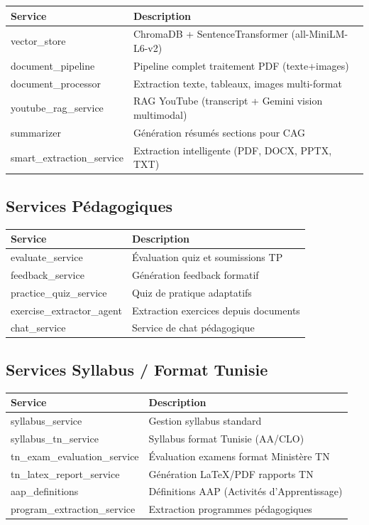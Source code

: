 \documentclass[12pt,a4paper]{article}
\begin{document}
\begin{longtable}{lp{9cm}}
\toprule
\textbf{Service} & \textbf{Description} \\
\midrule
vector\_store & ChromaDB + SentenceTransformer (all-MiniLM-L6-v2) \\
document\_pipeline & Pipeline complet traitement PDF (texte+images) \\
document\_processor & Extraction texte, tableaux, images multi-format \\
youtube\_rag\_service & RAG YouTube (transcript + Gemini vision multimodal) \\
summarizer & Génération résumés sections pour CAG \\
smart\_extraction\_service & Extraction intelligente (PDF, DOCX, PPTX, TXT) \\
\bottomrule
\end{longtable}

\subsection{Services Pédagogiques}

\begin{longtable}{lp{9cm}}
\toprule
\textbf{Service} & \textbf{Description} \\
\midrule
evaluate\_service & Évaluation quiz et soumissions TP \\
feedback\_service & Génération feedback formatif \\
practice\_quiz\_service & Quiz de pratique adaptatifs \\
exercise\_extractor\_agent & Extraction exercices depuis documents \\
chat\_service & Service de chat pédagogique \\
\bottomrule
\end{longtable}

\subsection{Services Syllabus / Format Tunisie}

\begin{longtable}{lp{9cm}}
\toprule
\textbf{Service} & \textbf{Description} \\
\midrule
syllabus\_service & Gestion syllabus standard \\
syllabus\_tn\_service & Syllabus format Tunisie (AA/CLO) \\
tn\_exam\_evaluation\_service & Évaluation examens format Ministère TN \\
tn\_latex\_report\_service & Génération \LaTeX{}/PDF rapports TN \\
aap\_definitions & Définitions AAP (Activités d'Apprentissage) \\
program\_extraction\_service & Extraction programmes pédagogiques \\
\bottomrule
\end{longtable}
\end{document}
